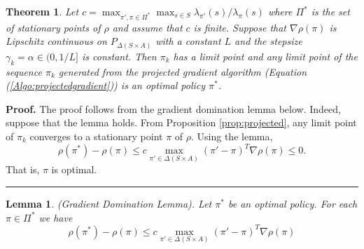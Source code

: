 \documentclass[letter,11pt]{article}
\newtheorem{theorem}{Theorem}[section]
\newtheorem{lemma}{Lemma}[section]
\newenvironment {proof}[1][Proof]{\noindent \textbf {#1.} }{\ \rule {0.5em}{0.5em}}
\begin{document}
\begin{theorem} \label{Theorem:Policyconvergence}
     Let $c=  \max _{\pi' , \pi \in \Pi^{*}} \max _{s \in S} \lambda _{\pi' }(s) /  \lambda _{\pi } (s) $ where $\Pi^{*}$ is the set of stationary points of $\rho$ and assume that $c$ is finite. Suppose that 
     $ \nabla \rho ( \pi)$ is Lipschitz continuous on $P_{\Delta (S \times A ) }$ with a constant $L$ and the stepsize $\gamma_{k} = \alpha \in (0,1/L]$ is constant. Then $\pi_{k}$ has a limit point and any limit point of the sequence $\pi_{k}$ generated from the projected gradient algorithm (Equation (\ref{Algo:projectedgradient})) is an optimal policy $\pi^{*}$. 
\end{theorem}

\begin{proof}
    The proof follows from the gradient domination lemma below. Indeed, suppose that the lemma holds. From Proposition \ref{prop:projected}, any limit point of $\pi_{k}$ converges to a stationary point $\pi$ of $\rho$. Using the lemma,
    $$\rho(\pi^{*}) - \rho ( \pi) \leq c \max _{\pi' \in \Delta(S \times A)} (\pi' - \pi) ^{T} \nabla \rho ( \pi) \leq 0.$$ That is, $\pi$ is optimal. 
    \end{proof}


  \begin{lemma} (Gradient Domination Lemma). 
   Let $\pi^{*}$ be an optimal policy. For each $\pi \in \Pi^{*}$ we have $$\rho(\pi^{*}) - \rho ( \pi) \leq c \max _{\pi' \in \Delta(S \times A)} (\pi' - \pi) ^{T} \nabla \rho ( \pi) $$
      \end{lemma}
\end{document}

